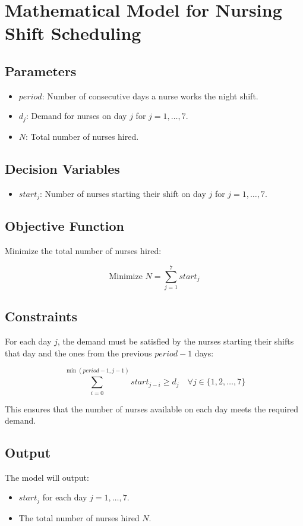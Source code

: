 \documentclass{article}
\begin{document}
\section*{Mathematical Model for Nursing Shift Scheduling}

\subsection*{Parameters}
\begin{itemize}
    \item $period$: Number of consecutive days a nurse works the night shift.
    \item $d_j$: Demand for nurses on day $j$ for $j = 1, \ldots, 7$.
    \item $N$: Total number of nurses hired.
\end{itemize}

\subsection*{Decision Variables}
\begin{itemize}
    \item $start_j$: Number of nurses starting their shift on day $j$ for $j = 1, \ldots, 7$.
\end{itemize}

\subsection*{Objective Function}
Minimize the total number of nurses hired:

\[
\text{Minimize } N = \sum_{j=1}^{7} start_j
\]

\subsection*{Constraints}
For each day $j$, the demand must be satisfied by the nurses starting their shifts that day and the ones from the previous $period - 1$ days:

\[
\sum_{i=0}^{\min(period-1, j-1)} start_{j-i} \geq d_j \quad \forall j \in \{1, 2, \ldots, 7\}
\]

This ensures that the number of nurses available on each day meets the required demand.

\subsection*{Output}
The model will output:
\begin{itemize}
    \item $start_j$ for each day $j = 1, \ldots, 7$.
    \item The total number of nurses hired $N$.
\end{itemize}
\end{document}
